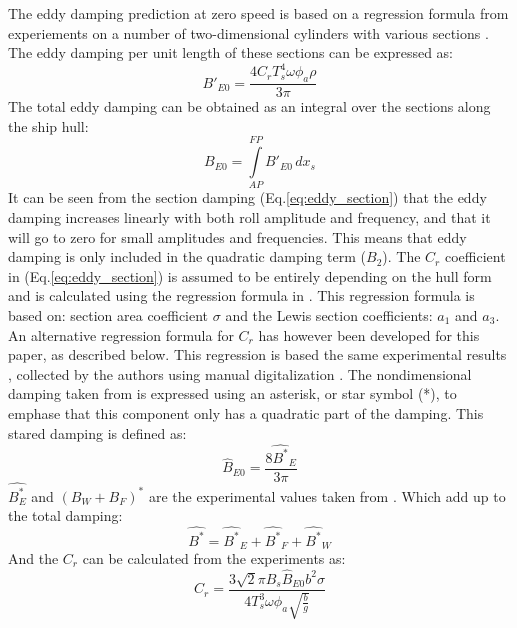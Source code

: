 The eddy damping prediction at zero speed is based on a regression
formula from experiements on a number of two-dimensional cylinders with
various sections \citep{7505983/4AFVVGNT}. The eddy damping per unit
length of these sections can be expressed as:
\begin{equation}
B'_{E0} = \frac{4 C_{r} T_{s}^{4} \omega \phi_{a} \rho}{3 \pi}
\label{eq:eddy_section}
\end{equation}
The total eddy damping can be obtained as an integral over the sections
along the ship hull:
\begin{equation}
B_{E0} = \int\limits_{AP}^{FP} B'_{E0}\, dx_{s}
\label{eq:eddy_integration}
\end{equation}
It can be seen from the section damping
(Eq.\ref{eq:eddy_section}) that the eddy damping increases
linearly with both roll amplitude and frequency, and that it will go to
zero for small amplitudes and frequencies. This means that eddy damping
is only included in the quadratic damping term ($B_2$). The $C_r$
coefficient in (Eq.\ref{eq:eddy_section}) is assumed to be
entirely depending on the hull form and is calculated using the
regression formula in \citep{7505983/4AFVVGNT}. This regression formula
is based on: section area coefficient $\sigma$ and the Lewis section
coefficients: $a_1$ and $a_3$. An alternative regression formula for
$C_r$ has however been developed for this paper, as described below.
This regression is based the same experimental results
\citep{7505983/4AFVVGNT}, collected by the authors using manual
digitalization \citep{7505983/QFWRBR3D}.
The nondimensional damping taken from \citep{7505983/4AFVVGNT} is
expressed using an asterisk, or star symbol (*), to emphase that this
component only has a quadratic part of the damping. This stared damping
is defined as:
\begin{equation}
\hat{B}_{E0} = \frac{8 \hat{B^*}_{E}}{3 \pi}
\label{eq:B_E_star_hat}
\end{equation}
$\hat{B_E^*}$ and $(B_W+B_F)^*$ are the experimental values taken
from \citep{7505983/4AFVVGNT}. Which add up to the total damping:
\begin{equation}
\hat{B^*} = \hat{B^*}_{E} + \hat{B^*}_{F} + \hat{B^*}_{W}
\label{eq:B_star_hat}
\end{equation}
And the $C_r$ can be calculated from the experiments as:
\begin{equation}
C_{r} = \frac{3 \sqrt{2} \pi B_{s} \hat{B}_{E0} b^{2} \sigma}{4 T_{s}^{3} \omega \phi_{a} \sqrt{\frac{b}{g}}}
\label{eq:C_r_2}
\end{equation}

